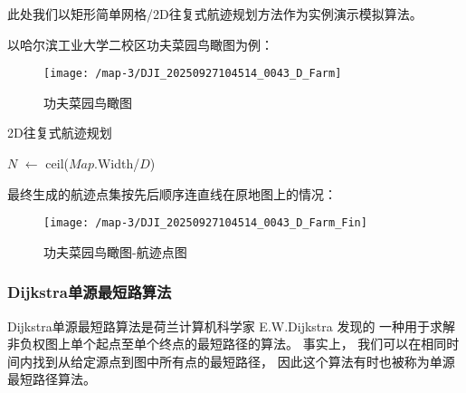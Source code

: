 \documentclass[12pt,a4paper,oneside,UTF8]{ctexart}
\begin{document}
此处我们以矩形简单网格/2D往复式航迹规划方法作为实例演示模拟算法。

以哈尔滨工业大学二校区功夫菜园鸟瞰图为例：

\begin{figure}[H]
  \centering
  \texttt{[image: /map-3/DJI\_20250927104514\_0043\_D\_Farm]}
  \caption{功夫菜园鸟瞰图}
  \label{fig:map-3-farm}
\end{figure}

\begin{algorithm}[H]
  \caption{2D往复式航迹规划}\label{traditional-simulation}

  $N$ $\leftarrow$ ceil($Map$.Width/$D$)\;
\end{algorithm}

最终生成的航迹点集按先后顺序连直线在原地图上的情况：

\begin{figure}[H]
  \centering
  \texttt{[image: /map-3/DJI\_20250927104514\_0043\_D\_Farm\_Fin]}
  \caption{功夫菜园鸟瞰图-航迹点图}
  \label{fig:map-3-farm-fin}
\end{figure}

\subsubsection{Dijkstra单源最短路算法}
Dijkstra单源最短路算法是荷兰计算机科学家 E.W.Dijkstra 发现的
一种用于求解非负权图上单个起点至单个终点的最短路径的算法。
事实上，
我们可以在相同时间内找到从给定源点到图中所有点的最短路径，
因此这个算法有时也被称为单源最短路径算法\cite{ref4}。
\end{document}
